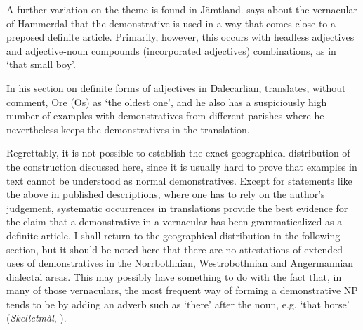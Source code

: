 
A further variation on the theme is found in Jämtland. \citet[38]{Reinhammar2005} says about the vernacular of Hammerdal that the demonstrative is used in a way that comes close to a preposed definite article. Primarily, however, this occurs with headless adjectives and adjective-noun compounds (incorporated adjectives) combinations, as in ‘that small boy’. 


In his section on definite forms of adjectives in Dalecarlian, \citet[147]{Levander1928} translates, without comment, Ore (Os)  as ‘the oldest one’, and he also has a suspiciously high number of examples with demonstratives from different parishes where he nevertheless keeps the demonstratives in the translation. 


Regrettably, it is not possible to establish the exact geographical distribution of the construction discussed here, since it is usually hard to prove that examples in text cannot be understood as normal demonstratives. Except for statements like the above in published descriptions, where one has to rely on the author’s judgement, systematic occurrences in translations provide the best evidence for the claim that a demonstrative in a vernacular has been grammaticalized as a definite article. I shall return to the geographical distribution in the following section, but it should be noted here that there are no attestations of extended uses of demonstratives in the Norrbothnian, Westrobothnian and Angermannian dialectal areas. This may possibly have something to do with the fact that, in many of those vernaculars, the most frequent way of forming a demonstrative NP tends to be by adding an adverb such as  ‘there’ after the noun, e.g.  ‘that horse’ (\textit{Skelletmål}, \citet[41]{Marklund1976}).


